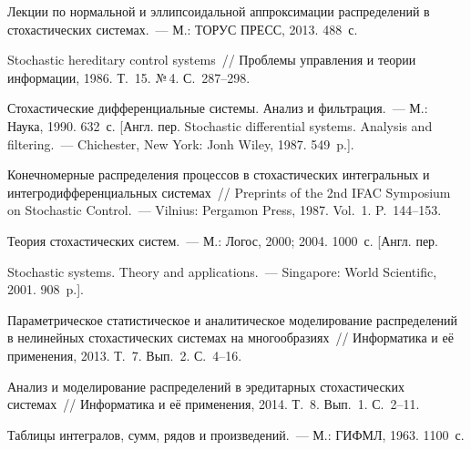 \begin{multicols}{2}
\vspace*{-9pt}

{\small\frenchspacing
 {%
 \begin{thebibliography}{99}

 \vspace*{-2pt}

Лекции по нормальной и эллипсоидальной аппроксимации распределений в
стохастических сис\-те\-мах.~--- М.: ТОРУС ПРЕСС, 2013. 488~с.

Stochastic hereditary control systems~// Проблемы управления и
теории информации, 1986. Т.~15. №\,4. С.~287--298.

Стохастические дифференциальные сис\-те\-мы. Анализ и фильтрация.~--- М.:
Наука,  1990.  632~с. [Англ. пер.
 Stochastic differential systems.
Analysis and filtering.~--- Chichester, New York: Jonh Wiley, 1987.
549~p.].

Конечномерные распределения процессов в стохастических интегральных
и интегродифференциальных системах~// Preprints of the 2nd IFAC
Symposium on Stochastic Control.~--- Vilnius: Pergamon Press,
1987.  Vol.~1. P.~144--153.

Теория стохастических систем.~--- М.: Логос, 2000; 2004. 1000~с.
[Англ. пер.\linebreak\vspace*{-12pt}

\pagebreak

\noindent Stochastic systems. Theory and  applications.~---
Singapore: World Scientific, 2001. 908~p.].

Параметрическое статистическое и аналитическое моделирование распределений
в нелинейных стохастических сис\-те\-мах на многообразиях~//
Информатика и её применения, 2013. Т.~7. Вып.~2. С.~4--16.

Анализ и моделирование распределений в эредитарных стохастических
сис\-те\-мах~// Информатика и её применения, 2014. Т.~8. Вып.~1.\linebreak
С.~2--11.



Таблицы интегралов, сумм, рядов и произведений.~--- М.: ГИФМЛ, 1963. 1100~с.


\end{thebibliography}}}
\end{multicols}
